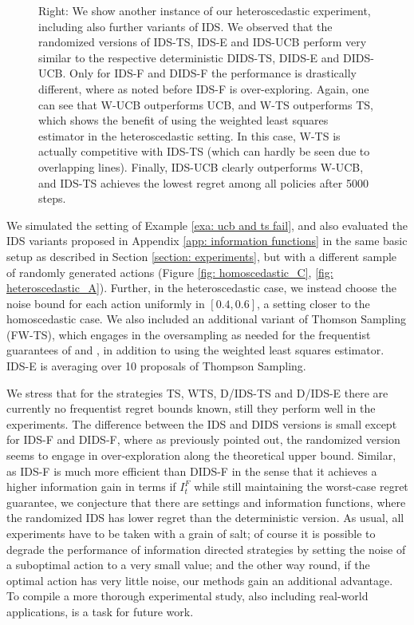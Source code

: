 \begin{figure}
{	Right: We show another instance of our heteroscedastic experiment, including also further variants of IDS. We observed that the randomized versions of IDS-TS, IDS-E and IDS-UCB perform very similar to the respective deterministic DIDS-TS, DIDS-E and DIDS-UCB. Only for IDS-F and DIDS-F the performance is drastically different, where as noted before IDS-F is over-exploring. Again, one can see that W-UCB outperforms UCB, and W-TS outperforms TS, which shows the benefit of using the weighted least squares estimator in the heteroscedastic setting. In this case, W-TS is actually competitive with IDS-TS (which can hardly be seen due to overlapping lines). Finally, IDS-UCB clearly outperforms W-UCB, and IDS-TS achieves the lowest regret among all policies after 5000 steps. }
\end{figure}

We simulated the setting of Example \ref{exa: ucb and ts fail}, and also evaluated the IDS variants proposed in Appendix \ref{app: information functions} in the same basic setup as described in Section \ref{section: experiments}, but with a different sample of randomly generated actions (Figure \ref{fig: homoscedastic_C}, \ref{fig: heteroscedastic_A}). Further, in the heteroscedastic case, we instead choose the noise bound for each action uniformly in $[0.4, 0.6]$, a setting closer to the homoscedastic case. We also included an additional variant of Thomson Sampling (FW-TS), which engages in the oversampling as needed for the frequentist guarantees of \cite{AgrawalThompsonSamplingContextual2013} and \cite{AbeilleLinearThompsonSampling2017}, in addition to using the weighted least squares estimator. IDS-E is averaging over 10 proposals of Thompson Sampling.

We stress that for the strategies TS, WTS, D/IDS-TS and D/IDS-E there are currently no frequentist regret bounds known, still they perform well in the experiments. The difference between the IDS and DIDS versions is small except for IDS-F and DIDS-F, where as previously pointed out, the randomized version seems to engage in over-exploration along the theoretical upper bound. Similar, as IDS-F is much more efficient than DIDS-F in the sense that it achieves a higher information gain in terms if $I_t^F$ while still maintaining the worst-case regret guarantee, we conjecture that there are settings and information functions, where the randomized IDS has lower regret than the deterministic version. As usual, all experiments have to be taken with a grain of salt; of course it is possible to degrade the performance of information directed strategies by setting the noise of a suboptimal action to a very small value; and the other way round, if the optimal action has very little noise, our methods gain an additional advantage. To compile a more thorough experimental study, also including real-world applications, is a task for future work.


